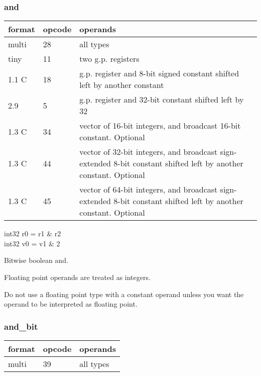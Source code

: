 \documentclass[forwardcom.tex]{subfiles}
\begin{document}
\subsubsection{and}
\label{table:andInstruction}
\begin{tabular}{|p{12mm}|p{12mm}|p{110mm}|}
\hline
\bfseries format & \bfseries opcode & \bfseries operands \\ \hline
multi & 28 & all types \\ \hline
tiny  & 11 & two g.p. registers \\ \hline
1.1 C & 18 & g.p. register and 8-bit signed constant shifted left by another constant \\ \hline
2.9   &  5 & g.p. register and 32-bit constant shifted left by 32 \\ \hline
1.3 C & 34 & vector of 16-bit integers, and broadcast 16-bit constant. Optional \\ \hline
1.3 C & 44 & vector of 32-bit integers, and broadcast sign-extended 8-bit constant shifted left by another constant. Optional \\ \hline
1.3 C & 45 & vector of 64-bit integers, and broadcast sign-extended 8-bit constant shifted left by another constant. Optional \\ \hline
\end{tabular}
\vspace{2mm}

int32 r0 = r1 \& r2 \\
int32 v0 = v1 \& 2
\vspace{2mm}

Bitwise boolean and.
\vspace{2mm}

Floating point operands are treated as integers.

Do not use a floating point type with a constant operand unless you want the operand to be interpreted as floating point.

\subsubsection{and\_bit}
\label{table:andBitInstruction}
\begin{tabular}{|p{12mm}|p{12mm}|p{110mm}|}
\hline
\bfseries format & \bfseries opcode & \bfseries operands \\ \hline
multi & 39 & all types \\ \hline
\end{tabular}
\vspace{2mm}
\end{document}
